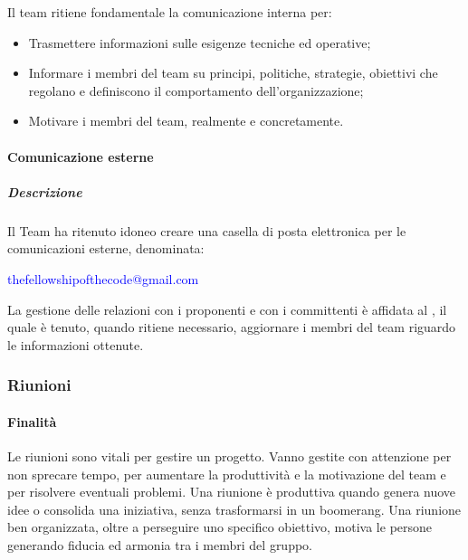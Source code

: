 Il team ritiene fondamentale la comunicazione interna per:
\begin{itemize}
\item
Trasmettere informazioni sulle esigenze tecniche ed operative;
\item
Informare i membri del team su principi, politiche, strategie, obiettivi che regolano e definiscono il comportamento dell'organizzazione;
\item
Motivare i membri del team, realmente e concretamente.
\end{itemize}


\paragraph{Comunicazione esterne}
\subparagraph{Descrizione}
Il Team ha ritenuto idoneo creare una casella di posta elettronica per le comunicazioni esterne, denominata:

\begin{center} \textcolor{blue}{thefellowshipofthecode@gmail.com} \end{center}

La gestione delle relazioni con i proponenti e con i committenti è affidata al \textit{\RdP}, il quale è tenuto, quando ritiene necessario, aggiornare i membri del team riguardo le informazioni ottenute. 


\subsubsection{Riunioni}

\paragraph{Finalità}
Le riunioni sono vitali per gestire un progetto. Vanno gestite con attenzione per non sprecare tempo, per aumentare la produttività e la motivazione del team e per risolvere eventuali problemi. Una riunione è produttiva quando genera nuove idee o consolida una iniziativa, senza trasformarsi in un boomerang.
Una riunione ben organizzata, oltre a perseguire uno specifico obiettivo, motiva le persone generando fiducia ed armonia tra i membri del gruppo.

 
